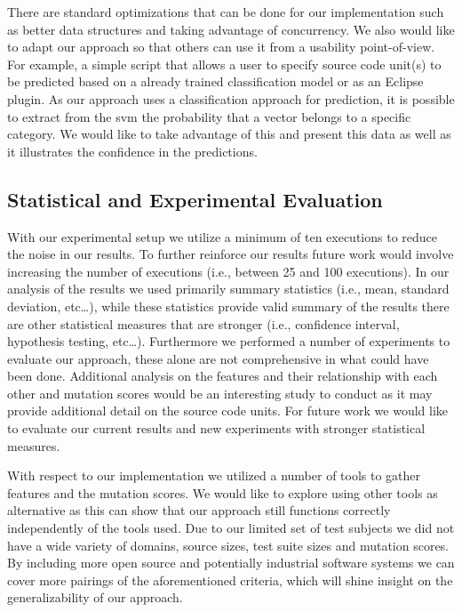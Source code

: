 There are standard optimizations that can be done for our implementation such as better data structures and taking advantage of concurrency. We also would like to adapt our approach so that others can use it from a usability point-of-view. For example, a simple script that allows a user to specify source code unit(s) to be predicted based on a already trained classification model or as an Eclipse plugin. As our approach uses a classification approach for prediction, it is possible to extract from the \gls{svm} the probability that a vector belongs to a specific category. We would like to take advantage of this and present this data as well as it illustrates the confidence in the predictions.


\subsection{Statistical and Experimental Evaluation}
\label{subsec:conclusions_experimental_evaluation}
With our experimental setup we utilize a minimum of ten executions to reduce the noise in our results. To further reinforce our results future work would involve increasing the number of executions (i.e., between 25 and 100 executions). In our analysis of the results we used primarily summary statistics (i.e., mean, standard deviation, etc\ldots), while these statistics provide valid summary of the results there are other statistical measures that are stronger (i.e., confidence interval, hypothesis testing, etc\ldots). Furthermore we performed a number of experiments to evaluate our approach, these alone are not comprehensive in what could have been done. Additional analysis on the features and their relationship with each other and mutation scores would be an interesting study to conduct as it may provide additional detail on the source code units. For future work we would like to evaluate our current results and new experiments with stronger statistical measures.

With respect to our implementation we utilized a number of tools to gather features and the mutation scores. We would like to explore using other tools as alternative as this can show that our approach still functions correctly independently of the tools used. Due to our limited set of test subjects we did not have a wide variety of domains, source sizes, test suite sizes and mutation scores. By including more open source and potentially industrial software systems we can cover more pairings of the aforementioned criteria, which will shine insight on the generalizability of our approach.


